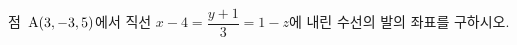 점~$\mathrm{A}(3{,}\mkern3mu\mathopen{}-3{,}\mkern3mu\mathopen{}5)$에서 직선 $x-4=\dfrac{y+1}{3}=1-z$에 내린 수선의 발의 좌표를 구하시오.
